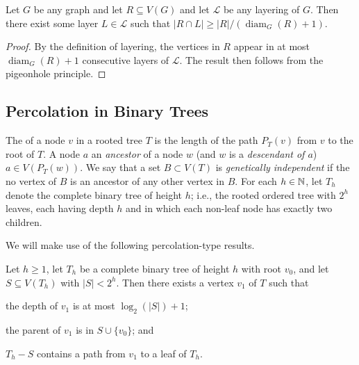 \documentclass{patmorin}
\newcommand{\defin}[1]{\emph{\color{brightmaroon}#1}}
\DeclareMathOperator{\diam}{diam}
\begin{document}
\begin{obs}\label{diameter_spread}
  Let $G$ be any graph and let $R\subseteq V(G)$ and let $\mathcal{L}$ be any layering of $G$.  Then there exist some layer $L\in\mathcal{L}$ such that $|R\cap L|\ge |R|/(\diam_G(R)+1)$.
\end{obs}

\begin{proof}
  By the definition of layering, the vertices in $R$ appear in at most $\diam_G(R)+1$ consecutive layers of $\mathcal{L}$. The result then follows from the pigeonhole principle.
\end{proof}

\subsection{Percolation in Binary Trees}


The  of a node $v$ in a rooted tree $T$ is the length of the path $P_T(v)$ from $v$ to the root of $T$.  A node $a$  an \defin{ancestor} of a node $w$ (and $w$ is a \defin{descendant of $a$}) $a\in V(P_T(w))$.  We say that a set $B\subset V(T)$ is \defin{genetically independent} if the no vertex of $B$ is an ancestor of any other vertex in $B$.  For each $h\in\mathbb{N}$, let $T_h$ denote the complete binary tree of height $h$; i.e., the rooted ordered tree with $2^h$ leaves, each having depth $h$ and in which each non-leaf node has exactly two children.  

We will make use of the following percolation-type results. 

\begin{lem}\label{one_path}
  Let $h\ge 1$, let $T_h$ be a complete binary tree of height $h$ with root $v_0$, and let $S\subseteq V(T_h)$ with $|S|< 2^h$. Then there exists a vertex $v_1$ of $T$ such that
  \begin{compactenum}[(i)]
    \item the depth of $v_1$ is at most $\log_2(|S|)+1$;
    \item the parent of $v_1$ is in $S\cup\{v_0\}$; and
    \item $T_h-S$ contains a path from $v_1$ to a leaf of $T_h$.
  \end{compactenum} 
\end{lem}
\end{document}

